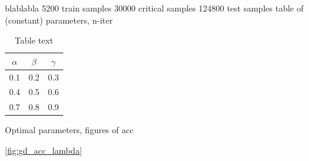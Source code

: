 blablabla
5200 train samples
30000 critical samples
124800 test samples
table of (constant) parameters, n-iter

\begin{table}[H]
\caption{Table text}
\centering
{}
\begin{tabular}{ccc}
\hline
\hline 
$\alpha$ & $\beta$ & $\gamma$
\\
\hline 
\hline 
0.1 & 0.2 & 0.3
\\
0.4 & 0.5 & 0.6
\\
0.7 & 0.8 & 0.9
\\
\hline
\end{tabular}
\label{tab:tab1}
\end{table}


Optimal parameters, figures of acc 

\autoref{fig:gd_acc_lambda}

